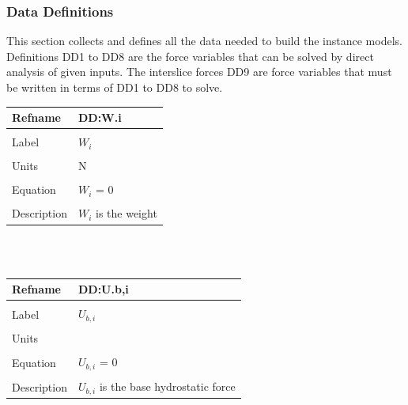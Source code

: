\documentclass[12pt]{article}
\begin{document}
\subsubsection{Data Definitions}
\label{Sec:DataDefi}
This section collects and defines all the data needed to build the instance models. Definitions DD1 to DD8 are the force variables that can be solved by direct analysis of given inputs. The interslice forces DD9 are force variables that must be written in terms of DD1 to DD8 to solve.
~\newline
\noindent \begin{minipage}{\textwidth}
\begin{tabular}{p{} p{}}
\toprule \textbf{Refname} & \textbf{DD:W.i}
\label{DD:W.i}
\\ \midrule \\
Label & $W_{i}$
\\ \midrule \\
Units & N
\\ \midrule \\
Equation & $W_{i}$ = $0$
\\ \midrule \\
Description & $W_{i}$ is the weight
\\ \bottomrule \end{tabular}
\end{minipage}\\
~\newline
\noindent \begin{minipage}{\textwidth}
\begin{tabular}{p{} p{}}
\toprule \textbf{Refname} & \textbf{DD:U.b,i}
\label{DD:U.b,i}
\\ \midrule \\
Label & $U_{b,i}$
\\ \midrule \\
Units & 
\\ \midrule \\
Equation & $U_{b,i}$ = $0$
\\ \midrule \\
Description & $U_{b,i}$ is the base hydrostatic force
\\ \bottomrule \end{tabular}
\end{minipage}\\
~\newline
\end{document}
